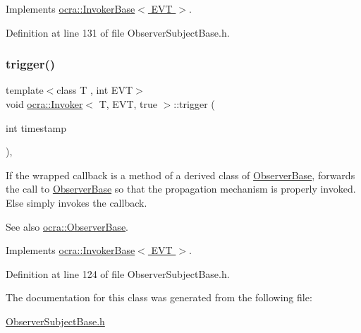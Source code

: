 Implements \hyperlink{classocra_1_1InvokerBase_a90d81926209cb3119933412f742bc245}{ocra\+::\+Invoker\+Base$<$ E\+V\+T $>$}.



Definition at line 131 of file Observer\+Subject\+Base.\+h.

\hypertarget{classocra_1_1Invoker_3_01T_00_01EVT_00_01true_01_4_a9b6283c07e6477a21c4b82b17940d832}{}\label{classocra_1_1Invoker_3_01T_00_01EVT_00_01true_01_4_a9b6283c07e6477a21c4b82b17940d832} 
\subsubsection{\texorpdfstring{trigger()}{trigger()}}
{\footnotesize\ttfamily template$<$class T , int E\+VT$>$ \\
void \hyperlink{classocra_1_1Invoker}{ocra\+::\+Invoker}$<$ T, E\+VT, true $>$\+::trigger (\begin{DoxyParamCaption}\item[{int}]{timestamp }\end{DoxyParamCaption})\hspace{0.3cm}{\ttfamily [inline]}, {\ttfamily [virtual]}}

If the wrapped callback is a method of a derived class of \hyperlink{classocra_1_1ObserverBase}{Observer\+Base}, forwards the call to \hyperlink{classocra_1_1ObserverBase}{Observer\+Base} so that the propagation mechanism is properly invoked. Else simply invokes the callback. \begin{DoxySeeAlso}{See also}
\hyperlink{classocra_1_1ObserverBase}{ocra\+::\+Observer\+Base}. 
\end{DoxySeeAlso}


Implements \hyperlink{classocra_1_1InvokerBase_ae4d7537a1b2c0aa9b5188c5da8423289}{ocra\+::\+Invoker\+Base$<$ E\+V\+T $>$}.



Definition at line 124 of file Observer\+Subject\+Base.\+h.



The documentation for this class was generated from the following file\+:\begin{DoxyCompactItemize}
\item 
\hyperlink{ObserverSubjectBase_8h}{Observer\+Subject\+Base.\+h}\end{DoxyCompactItemize}
